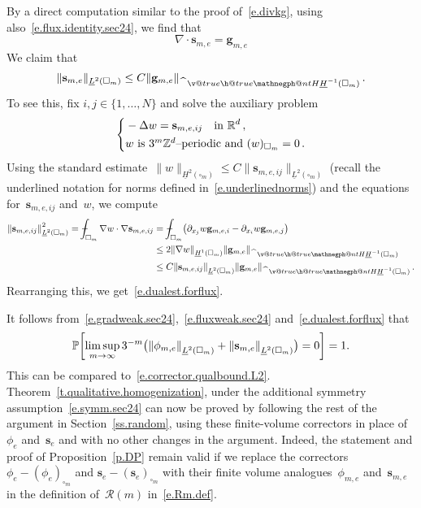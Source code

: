 \documentclass[11pt]{article} %
\makeatletter
\let\oldsquare\square %
\renewcommand{\square}{\oldsquare}
\numberwithin{equation}{section}
\theoremstyle{definition}
\let\originalleft\left
\let\originalright\right
\renewcommand{\left}{\mathopen{}\mathclose\bgroup\originalleft}
\renewcommand{\right}{\aftergroup\egroup\originalright}
\newcommand*{\Z}{\ensuremath{\mathbb{Z}}}
\newcommand*{\R}{\ensuremath{\mathbb{R}}}
\renewcommand*{\hat}{\widehat}
\newcommand{\g}{\mathbf{g}}
\newcommand{\s}{\mathbf{s}}
\newcommand{\cu}{\square}
\renewcommand{\P}{\mathbb{P}}
\def\Xint#1{\mathchoice
{\XXint\displaystyle\textstyle{#1}}%
{\XXint\textstyle\scriptstyle{#1}}%
{\XXint\scriptstyle\scriptscriptstyle{#1}}%
{\XXint\scriptscriptstyle\scriptscriptstyle{#1}}%
\!\int}
\def\XXint#1#2#3{{\setbox0=\hbox{$#1{#2#3}{\int}$}
\vcenter{\hbox{$#2#3$}}\kern-.5\wd0}}
\def\fint{\Xint-}
\newcommand{\negphantom}{\v@true\h@true\negph@nt}
\newcommand{\negph@nt}{\ifmmode\expandafter\mathpalette 
  \expandafter\mathnegph@nt\else\expandafter\makenegph@nt\fi}
\newcommand{\makenegph@nt}[1]{%
  \setbox\z@\hbox{\color@begingroup#1\color@endgroup}\finnegph@nt}
\newcommand{\finnegph@nt}{%
  \setbox\tw@\null 
  \ifv@ \ht\tw@\ht\z@\dp\tw@\dp\z@\fi \ifh@\wd\tw@-\wd\z@\fi\box\tw@}
\newcommand{\mathnegph@nt}[2]{%
  \setbox\z@\hbox{$\m@th #1{#2}$}\finnegph@nt}
\newcommand{\Hminusul}{\hat{\phantom{H}}\negphantom{H}\underline{H}^{-1}}
\makeatother
\begin{document}
By a direct computation similar to the proof of~\eqref{e.divkg}, using also~\eqref{e.flux.identity.sec24}, we find that  
\begin{equation}
\label{e.fluxcorrect.FV.divg}
\nabla \cdot \s_{m,e} = \g_{m,e}
\end{equation}
We claim that 
\begin{equation}
\label{e.dualest.forflux}
\| \s_{m,e} \|_{\underline{L}^2(\cu_m)} 
\leq
C\| \g_{m,e} \|_{\Hminusul(\cu_m)} \,.
\end{equation}
To see this, fix $i,j\in\{1,\ldots,N\}$ and solve the auxiliary problem 
\begin{equation*}
\left\{
\begin{aligned}
&
-\Delta w = \s_{m,e,ij} 
\quad \mbox{in}  \ \R^d \,,
\\
& w  \ \mbox{is $3^m\Z^d$--periodic and} \ ( w )_{\cu_m} = 0
\,.
\end{aligned}
\right. 
\end{equation*}
Using the standard estimate~$\| w \|_{\underline{H}^2(\cu_m)} \leq C \| \s_{m,e,ij} \|_{\underline{L}^2(\cu_m)}$ (recall the underlined notation for norms defined in~\eqref{e.underlinednorms}) and the equations for~$\s_{m,e,ij}$ and~$w$, we compute
\begin{align*}
\left\| \s_{m,e,ij} \right\|_{\underline{L}^2(\cu_m)}^2 
=
\fint_{\cu_m} \nabla w \cdot \nabla \s_{m,e,ij} 
& 
= 
\fint_{\cu_m} \bigl( 
\partial_{x_j} w \g_{m,e,i} - \partial_{x_i} w \g_{m,e,j} \bigr)
\\ & 
\leq 
2 \left\| \nabla w \right\|_{\underline{H}^1(\cu_m)} \left\| \g_{m,e} \right\|_{\Hminusul(\cu_m)}
\\ &
\leq 
C \left\| \s_{m,e,ij} \right\|_{\underline{L}^2(\cu_m)} \left\| \g_{m,e} \right\|_{\Hminusul(\cu_m)}\,.
\end{align*}
Rearranging this, we get~\eqref{e.dualest.forflux}. 

\smallskip

It follows from~\eqref{e.gradweak.sec24},~\eqref{e.fluxweak.sec24} and~\eqref{e.dualest.forflux} that 
\begin{equation}
\label{e.corrector.qualbound.L2.sec24}
\P \biggl[ 
\limsup_{m\to \infty}
3^{-m} 
\bigl(
\left\|  \phi_{m,e}  \right\|_{\underline{L}^{2}(\cu_m)}
+
\left\|  \s_{m,e}  \right\|_{\underline{L}^{2}(\cu_m)}
\bigr) = 0 \biggr] = 1. 
\end{equation}
This can be compared to~\eqref{e.corrector.qualbound.L2}. Theorem~\ref{t.qualitative.homogenization}, under the additional symmetry assumption~\eqref{e.symm.sec24} can now be proved by following the rest of the argument in Section~\ref{ss.random}, using these finite-volume correctors in place of~$\phi_e$ and~$\s_e$ and with no other changes in the argument. Indeed, the statement and proof of Proposition~\ref{p.DP} remain valid if we replace the correctors~$\phi_e - (\phi_e)_{\cu_m}$ and $\s_e - (\s_e)_{\cu_m}$ with their finite volume analogues~$\phi_{m,e}$ and~$\s_{m,e}$ in the definition of~$\mathcal{R}(m)$ in~\eqref{e.Rm.def}. 
\end{document}
